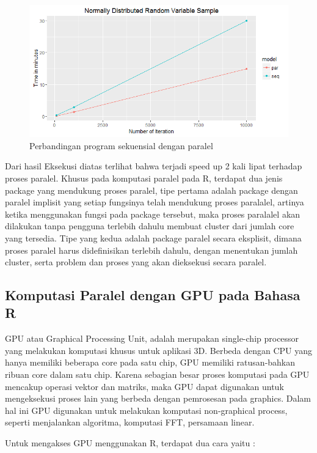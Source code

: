 \begin{figure}
\centering
\includegraphics[width=0.7\linewidth]{./pics/perbandingan}
\caption{Perbandingan program sekuensial dengan paralel}
\label{fig:perbandingan}
\end{figure}

Dari hasil Eksekusi diatas terlihat bahwa terjadi speed up 2 kali lipat terhadap proses paralel. Khusus pada komputasi paralel pada R, terdapat dua jenis package yang mendukung proses paralel, tipe pertama adalah package dengan paralel implisit yang setiap fungsinya telah mendukung proses paralalel, artinya ketika menggunakan fungsi pada package tersebut, maka proses paralalel akan dilakukan tanpa pengguna terlebih dahulu membuat cluster dari jumlah core yang tersedia. Tipe yang kedua adalah package paralel secara eksplisit, dimana proses paralel harus didefinisikan terlebih dahulu, dengan menentukan jumlah cluster, serta problem dan proses yang akan dieksekusi secara paralel.

\subsection{Komputasi Paralel dengan GPU pada Bahasa R}

GPU atau Graphical Processing Unit, adalah merupakan single-chip processor yang melakukan komputasi khusus untuk aplikasi 3D.  Berbeda dengan CPU yang hanya memiliki beberapa core pada satu chip, GPU memiliki ratusan-bahkan ribuan core dalam satu chip. Karena sebagian besar proses komputasi pada GPU mencakup operasi vektor dan matriks, maka GPU dapat digunakan untuk mengeksekusi proses lain yang berbeda dengan pemrosesan pada graphics. Dalam hal ini GPU digunakan untuk melakukan komputasi non-graphical process, seperti menjalankan algoritma, komputasi FFT, persamaan linear.

Untuk mengakses GPU menggunakan R, terdapat dua cara yaitu :

